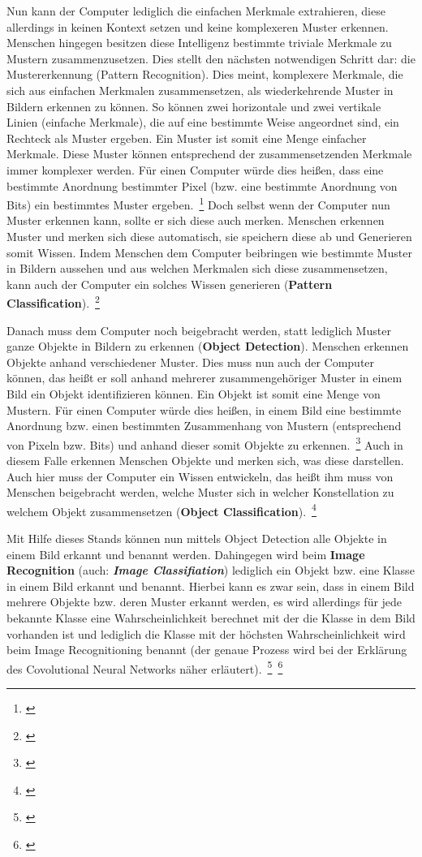 Nun kann der Computer lediglich die einfachen Merkmale extrahieren, diese allerdings in keinen Kontext setzen und keine komplexeren Muster erkennen. Menschen hingegen besitzen diese Intelligenz bestimmte triviale Merkmale zu Mustern zusammenzusetzen. Dies stellt den nächsten notwendigen Schritt dar: die Mustererkennung (Pattern Recognition). Dies meint, komplexere Merkmale, die sich aus einfachen Merkmalen zusammensetzen, als wiederkehrende Muster in Bildern erkennen zu können. So können zwei horizontale und zwei vertikale Linien (einfache Merkmale), die auf eine bestimmte Weise angeordnet sind, ein Rechteck als Muster ergeben. Ein Muster ist somit eine Menge einfacher Merkmale. Diese Muster können entsprechend der zusammensetzenden Merkmale immer komplexer werden. Für einen Computer würde dies heißen, dass eine bestimmte Anordnung bestimmter Pixel (bzw. eine bestimmte Anordnung von Bits) ein bestimmtes Muster ergeben.~\footnote{\cite[S.~3]{Burger.2015}} Doch selbst wenn der Computer nun Muster erkennen kann, sollte er sich diese auch merken. Menschen erkennen Muster und merken sich diese automatisch, sie speichern diese ab und Generieren somit Wissen. Indem Menschen dem Computer beibringen wie bestimmte Muster in Bildern aussehen und aus welchen Merkmalen sich diese zusammensetzen, kann auch der Computer ein solches Wissen generieren (\textbf{Pattern Classification}).~\footnote{\cite[S.~15--16]{HabibiAghdam.2017}}

Danach muss dem Computer noch beigebracht werden, statt lediglich Muster ganze Objekte in Bildern zu erkennen (\textbf{Object Detection}). Menschen erkennen Objekte anhand verschiedener Muster. Dies muss nun auch der Computer können, das heißt er soll anhand mehrerer zusammengehöriger Muster in einem Bild ein Objekt identifizieren können. Ein Objekt ist somit eine Menge von Mustern. Für einen Computer würde dies heißen, in einem Bild eine bestimmte Anordnung bzw. einen bestimmten Zusammenhang von Mustern (entsprechend von Pixeln bzw. Bits) und anhand dieser somit Objekte zu erkennen.~\footnote{\cite[S.~247--253]{Karray.2017}}  Auch in diesem Falle erkennen Menschen Objekte und merken sich, was diese darstellen. Auch hier muss der Computer ein Wissen entwickeln, das heißt ihm muss von Menschen beigebracht werden, welche Muster sich in welcher Konstellation zu welchem Objekt zusammensetzen (\textbf{Object Classification}).~\footnote{\cite[S.~277]{HabibiAghdam.2017}}

Mit Hilfe dieses Stands können nun mittels Object Detection alle Objekte in einem Bild erkannt und benannt werden. Dahingegen wird beim \textbf{Image Recognition} (auch: \textit{\textbf{Image Classifiation}}) lediglich ein Objekt bzw. eine Klasse in einem Bild erkannt und benannt. Hierbei kann es zwar sein, dass in einem Bild mehrere Objekte bzw. deren Muster erkannt werden, es wird allerdings für jede bekannte Klasse eine Wahrscheinlichkeit berechnet mit der die Klasse in dem Bild vorhanden ist und lediglich die Klasse mit der höchsten Wahrscheinlichkeit wird beim Image Recognitioning benannt (der genaue Prozess wird bei der Erklärung des Covolutional Neural Networks näher erläutert).~\footnote{\cite{SatyaMallick.2016}}~\footnote{\cite{VipulJain.02.04.2018}}

